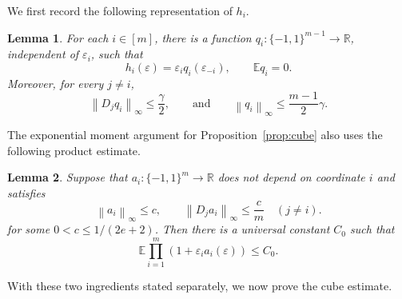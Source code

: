 \documentclass[11pt]{article}
\newtheorem{lemma}{Lemma}
\newcommand{\E}{\mathbb{E}}
\newcommand{\norm}[1]{\left\lVert #1\right\rVert}
\begin{document}
We first record the following representation of $h_i$. 
\begin{lemma}\label{lem:representation}
For each $i\in[m]$, there is a function $q_i:\{-1,1\}^{m-1}\to\mathbb R$, independent of $\varepsilon_i$, such that
\[
h_i(\varepsilon) = \varepsilon_i q_i(\varepsilon_{-i}),
\qquad 
\E q_i=0.
\]
Moreover, for every $j\neq i$,
\begin{equation}\label{eq:qi-differences}
\norm{D_jq_i}_\infty \le \frac{\gamma}{2}, 
\qquad \text{and} \qquad \norm{q_i}_\infty \le \frac{m-1}{2}\gamma.
\end{equation}
\end{lemma} 

The exponential moment argument for Proposition~\ref{prop:cube} also uses the following product estimate.

\begin{lemma}\label{lem:product}
Suppose that $a_i:\{-1,1\}^m\to\mathbb R$ does not depend on coordinate $i$ and satisfies
\begin{equation}\label{eq:ai-assumptions}
\norm{a_i}_\infty \le c,
\qquad 
\norm{D_ja_i}_\infty \le \frac{c}{m}
\quad(j\neq i). 
\end{equation} 
for some $0 < c \le 1/(2e+2)$. Then there is a universal constant $C_0$ such that
\[
\E\prod_{i=1}^m \left(1+\varepsilon_i a_i(\varepsilon)\right) \le C_0.
\]
\end{lemma}

With these two ingredients stated separately, we now prove the cube estimate.
\end{document}
